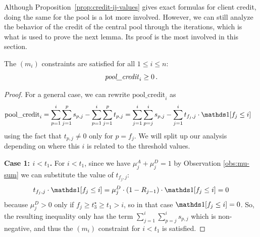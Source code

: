 Although Proposition~\ref{prop:credit-ij-values} gives exact formulas for client credit, doing the same for the pool is a lot more involved. However, we can still analyze the behavior of the credit of the central pool through the iterations, which is what is used to prove the next lemma. Its proof is the most involved in this section.
\begin{lemma}\label{lem:mi-constraints}
    The $(m_{i})$ constraints are satisfied for all $1 \leq i \leq n$:
    \begin{equation*}
        \text{\emph{pool\_credit}}_i \geq 0\,.
    \end{equation*}
\end{lemma}
\begin{proof}    
    For a general case, we can rewrite $\text{pool\_credit}_{i}$ as
    \begin{equation}\label{eq:mi-rewrite}
        \begin{aligned}
            \text{pool\_credit}_{i} &= 
            \sum_{p=1}^i \sum_{j=1}^p s_{p,j} - \sum_{p=1}^i \sum_{j=1}^p t_{p,j}
            = \sum_{j=1}^i \sum_{p=j}^i s_{p,j} - \sum_{j=1}^i t_{f_j, j} \cdot \ind [f_j \leq i]
        \end{aligned}
    \end{equation}
    using the fact that $t_{p,j} \neq 0$ only for $p = f_j$. We will split up our analysis depending on where this $i$ is related to the threshold values.

    \smallskip
    \noindent\textbf{Case 1: $i<t_1$.} For $i < t_1$, since we have $\mu_j^A + \mu_j^D = 1$ by Observation \ref{obs:mu-sum} we can substitute the value of $t_{f_j,j}$: 
    \begin{equation*}
        t_{f_j, j} \cdot \ind [f_j \leq i] = \mu_j^D \cdot (1-R_{j-1}) \cdot \ind [f_j \leq i] = 0
    \end{equation*}
    because $\mu_j^D>0$ only if $f_j \geq t_3^\star \geq t_1 > i$, so in that case $\ind [f_j \leq i] =0$. So, the resulting inequality only has the term $\sum_{j=1}^i \sum_{p=j}^i s_{p,j}$ which is non-negative, and thus the $(m_i)$ constraint for $i<t_1$ is satisfied.


\end{proof}
